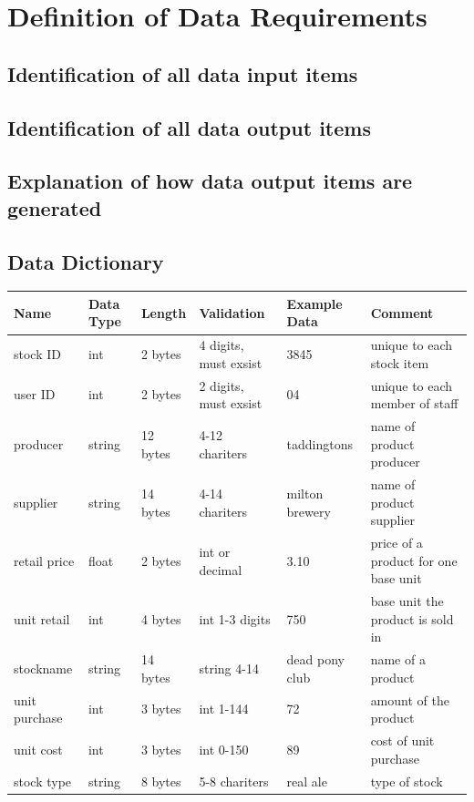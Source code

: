 \section{Definition of Data Requirements}

\subsection{Identification of all data input items}

\subsection{Identification of all data output items}

\subsection{Explanation of how data output items are generated}

\subsection{Data Dictionary}
\begin{center}
\begin{tabular}{|p{2cm}|p{1cm}|p{1.5cm}|p{2.5cm}|p{2.5cm}|p{3cm}|}
    \hline
    \textbf{Name} & \textbf{Data Type} & \textbf{Length} & \textbf{Validation} & \textbf{Example Data} & \textbf{Comment} \\ \hline
	stock ID & int & 2 bytes & 4 digits, must exsist & 3845 & unique to each stock item\\ \hline
	user ID & int & 2 bytes & 2 digits, must exsist & 04 & unique to each member of staff\\ \hline
	producer & string & 12 bytes & 4-12 chariters & taddingtons & name of product producer\\ \hline
	supplier & string & 14 bytes & 4-14 chariters & milton brewery & name of product supplier \\ \hline
	retail price & float & 2 bytes & int or decimal & 3.10 & price of a product for one base unit\\ \hline
	unit retail & int & 4 bytes & int 1-3 digits & 750 & base unit the product is sold in\\ \hline
	stockname & string & 14 bytes & string 4-14 & dead pony club & name of a product\\ \hline
	unit purchase & int & 3 bytes & int 1-144 & 72 & amount of the product\\ \hline
	unit cost & int & 3 bytes & int 0-150 & 89 & cost of unit purchase\\ \hline
	stock type & string & 8 bytes & 5-8 chariters & real ale & type of stock\\ \hline
	 
\end{tabular}
\label{tab:range_examples}
\end{center}

